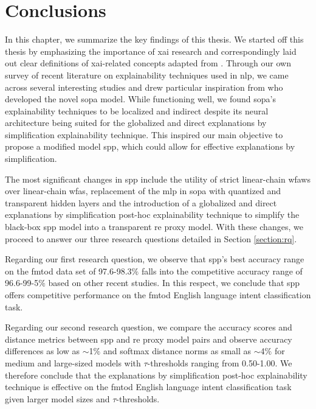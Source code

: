 \chapter{Conclusions}

\label{chapter:conclusions}

In this chapter, we summarize the key findings of this thesis. We
started off this thesis by emphasizing the importance of \ac{xai} research and
correspondingly laid out clear definitions of \ac{xai}-related concepts adapted
from \citet{arrieta2020explainable}. Through our own survey of recent literature
on explainability techniques used in \ac{nlp}, we came across several
interesting studies and drew particular inspiration from
\citet{schwartz2018sopa} who developed the novel \ac{sopa} model. While functioning
well, we found \ac{sopa}'s explainability techniques to be localized and indirect
despite its neural architecture being suited for the globalized and direct
explanations by simplification explainability technique. This inspired our main
objective to propose a modified model \ac{spp}, which could allow for
effective explanations by simplification.

The most significant changes in \ac{spp} include the utility of strict
linear-chain \ac{wfaws} over linear-chain \ac{wfas}, replacement of the \ac{mlp}
in \ac{sopa} with quantized and transparent hidden layers and the introduction of a
globalized and direct explanations by simplification post-hoc explainability
technique to simplify the black-box \ac{spp} model into a transparent \ac{re}
proxy model. With these changes, we proceed to answer our three research
questions detailed in Section \ref{section:rq}.

Regarding our first research question, we observe that \ac{spp}'s best accuracy
range on the \ac{fmtod} data set of 97.6-98.3$\%$ falls into the competitive accuracy
range of 96.6-99-5$\%$ based on other recent studies. In this respect, we
conclude that \ac{spp} offers competitive performance on the \ac{fmtod} English
language intent classification task.

Regarding our second research question, we compare the accuracy scores and
distance metrics between \ac{spp} and \ac{re} proxy model pairs and observe accuracy
differences as low as $\sim$1$\%$ and softmax distance norms as small as $\sim$4$\%$ for
medium and large-sized models with $\tau$-thresholds ranging from 0.50-1.00. We
therefore conclude that the explanations by simplification post-hoc
explainability technique is effective on the \ac{fmtod} English language intent
classification task given larger model sizes and $\tau$-thresholds.

